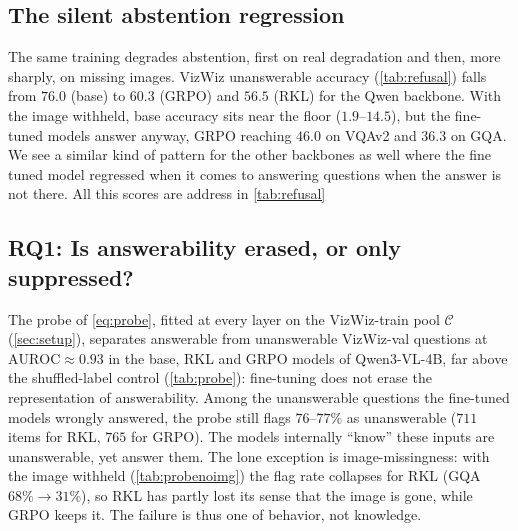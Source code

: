 \subsection{The silent abstention regression}
\label{sec:regression}

The same training degrades abstention, first on real degradation and then, more sharply,
on missing images. VizWiz unanswerable accuracy (\cref{tab:refusal}) falls from $76.0$
(base) to $60.3$ (GRPO) and $56.5$ (RKL) for the Qwen backbone. With the image withheld, base accuracy sits near
the floor ($1.9$--$14.5$), but the fine-tuned models answer anyway, GRPO reaching $46.0$ on
VQAv2 and $36.3$ on GQA. We see a similar kind of pattern for the other backbones as well where the fine tuned model regressed when it comes to answering questions when the answer is not there. All this scores are address in \cref{tab:refusal}

\subsection{RQ1: Is answerability erased, or only suppressed?}
\label{sec:rq1}

The probe of \cref{eq:probe}, fitted at every layer on the VizWiz-train pool $\mathcal{C}$
(\cref{sec:setup}), separates answerable from unanswerable VizWiz-val questions at $\mathrm{AUROC}\approx0.93$ in the base,
RKL and GRPO models of Qwen3-VL-4B, far above the shuffled-label control
(\cref{tab:probe}): fine-tuning does not erase the representation of answerability. Among
the unanswerable questions the fine-tuned models wrongly answered, the probe still flags
$76$--$77\%$ as unanswerable ($711$ items for RKL, $765$ for GRPO). The models internally
``know'' these inputs are unanswerable, yet answer them. The lone exception is
image-missingness: with the image withheld (\cref{tab:probenoimg}) the flag rate collapses
for RKL (GQA $68\% \rightarrow 31\%$), so RKL has partly lost its sense that the image is
gone, while GRPO keeps it. The failure is thus one of behavior, not knowledge.

